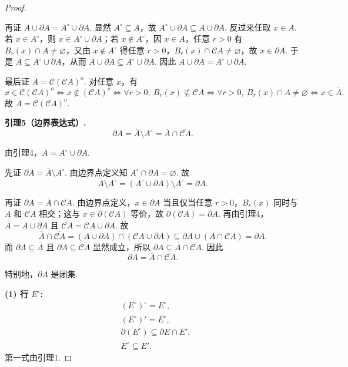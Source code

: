 \begin{3b}
\begin{enumerate}
\begin{proof}
\begin{proofc}
再证 $A\cup\partial A=A^\circ\cup\partial A$.
显然 $A^\circ\subseteq A$，故 $A^\circ\cup\partial A\subseteq A\cup\partial A$.
反过来任取 $x\in A$.
若 $x\in A^\circ$，则 $x\in A^\circ\cup\partial A$；若 $x\notin A^\circ$，因 $x\in A$，任意 $r>0$ 有 $B_r(x)\cap A\neq\varnothing$，又由 $x\notin A^\circ$ 得任意 $r>0$，$B_r(x)\cap\mathscr{C}A\neq\varnothing$，故 $x\in\partial A$.
于是 $A\subseteq A^\circ\cup\partial A$，从而 $A\cup\partial A\subseteq A^\circ\cup\partial A$.
因此 $A\cup\partial A=A^\circ\cup\partial A$.

最后证 $\overline{A}=\mathscr{C}(\mathscr{C}A)^o$.
对任意 $x$，有
\[
x\in\mathscr{C}(\mathscr{C}A)^o
\Longleftrightarrow x\notin (\mathscr{C}A)^o
\Longleftrightarrow \forall r>0,\ B_r(x)\not\subseteq\mathscr{C}A
\Longleftrightarrow \forall r>0,\ B_r(x)\cap A\neq\varnothing
\Longleftrightarrow x\in\overline{A}.
\]
故 $\overline{A}=\mathscr{C}(\mathscr{C}A)^o$.
\end{proofc}
\textbf{引理5（边界表达式）.}
\[\partial A=\overline{A}\setminus A^\circ=\overline{A}\cap\overline{\mathscr{C}A}.\]

\begin{proofc}
由引理4，$\overline{A}=A^\circ\cup\partial A$.

先证 $\partial A=\overline{A}\setminus A^\circ$.
由边界点定义知 $A^\circ\cap\partial A=\varnothing$.
故
\[\overline{A}\setminus A^\circ=(A^\circ\cup\partial A)\setminus A^\circ=\partial A.\]

再证 $\partial A=\overline{A}\cap\overline{\mathscr{C}A}$.
由边界点定义，$x\in\partial A$ 当且仅当任意 $r>0$，$B_r(x)$ 同时与 $A$ 和 $\mathscr{C}A$ 相交；这与 $x\in\partial(\mathscr{C}A)$ 等价，故 $\partial(\mathscr{C}A)=\partial A$.
再由引理4，$\overline{A}=A\cup\partial A$ 且 $\overline{\mathscr{C}A}=\mathscr{C}A\cup\partial A$.
故
\[\overline{A}\cap\overline{\mathscr{C}A}
=(A\cup\partial A)\cap(\mathscr{C}A\cup\partial A)
\subseteq \partial A\cup (A\cap\mathscr{C}A)=\partial A.\]
而 $\partial A\subseteq\overline{A}$ 且 $\partial A\subseteq\overline{\mathscr{C}A}$ 显然成立，所以 $\partial A\subseteq\overline{A}\cap\overline{\mathscr{C}A}$.
因此
\[\partial A=\overline{A}\cap\overline{\mathscr{C}A}.\]

特别地，$\partial A$ 是闭集.
\end{proofc}

\textbf{(1) 行 $E^\circ$:}
\begin{align*}
&(E^\circ)^\circ=E^\circ,\\
&(E^\circ)'=\overline{E^\circ},\\
&\partial(E^\circ)\subseteq \partial E\cap E',\\
&\overline{E^\circ}\subseteq E'.
\end{align*}
第一式由引理1.


\end{proof}
\end{enumerate}
\end{3b}
